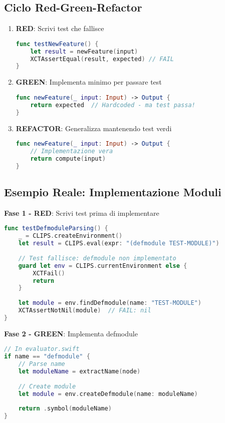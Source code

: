\subsection{Ciclo Red-Green-Refactor}

\begin{enumerate}
\item \textbf{RED}: Scrivi test che fallisce
\begin{lstlisting}[language=Swift]
func testNewFeature() {
    let result = newFeature(input)
    XCTAssertEqual(result, expected) // FAIL
}
\end{lstlisting}

\item \textbf{GREEN}: Implementa minimo per passare test
\begin{lstlisting}[language=Swift]
func newFeature(_ input: Input) -> Output {
    return expected  // Hardcoded - ma test passa!
}
\end{lstlisting}

\item \textbf{REFACTOR}: Generalizza mantenendo test verdi
\begin{lstlisting}[language=Swift]
func newFeature(_ input: Input) -> Output {
    // Implementazione vera
    return compute(input)
}
\end{lstlisting}
\end{enumerate}

\subsection{Esempio Reale: Implementazione Moduli}

\textbf{Fase 1 - RED}: Scrivi test prima di implementare

\begin{lstlisting}[language=Swift]
func testDefmoduleParsing() {
    _ = CLIPS.createEnvironment()
    let result = CLIPS.eval(expr: "(defmodule TEST-MODULE)")
    
    // Test fallisce: defmodule non implementato
    guard let env = CLIPS.currentEnvironment else {
        XCTFail()
        return
    }
    
    let module = env.findDefmodule(name: "TEST-MODULE")
    XCTAssertNotNil(module)  // FAIL: nil
}
\end{lstlisting}

\textbf{Fase 2 - GREEN}: Implementa defmodule

\begin{lstlisting}[language=Swift]
// In evaluator.swift
if name == "defmodule" {
    // Parse name
    let moduleName = extractName(node)
    
    // Create module
    let module = env.createDefmodule(name: moduleName)
    
    return .symbol(moduleName)
}
\end{lstlisting}

